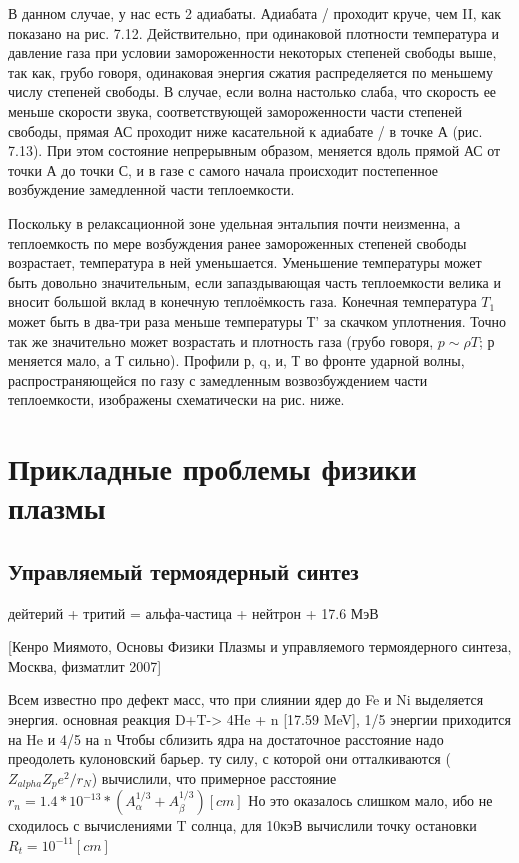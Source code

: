 \documentclass[10pt, a4paper]{article}
\let\stdsection\section
\renewcommand\section{\newpage\stdsection}
\begin{document}
В данном случае, у нас есть 2 адиабаты. Адиабата / проходит круче, чем II, как показано на рис. 7.12. Действительно, при одинаковой плотности температура и давление газа при 
условии замороженности некоторых степеней свободы выше, так как, грубо говоря, одинаковая энергия сжатия распределяется по меньшему числу степеней свободы.
В случае, если волна настолько слаба, что скорость ее меньше скорости звука, соответствующей замороженности части степеней свободы, прямая АС проходит ниже касательной к адиабате / в точке А (рис. 7.13). При этом состояние непрерывным образом, меняется вдоль прямой АС от точки А до точки С, и в газе с самого начала происходит постепенное возбуждение замедленной части теплоемкости. 

Поскольку в релаксационной зоне удельная энтальпия почти неизменна, а теплоемкость по мере возбуждения ранее замороженных степеней свободы возрастает, температура в ней уменьшается. Уменьшение температуры может быть довольно значительным, если запаздывающая часть теплоемкости велика и вносит большой вклад в конечную теплоёмкость газа. Конечная температура $T_1$ может быть в два-три раза меньше температуры Т' за скачком уплотнения. Точно так же значительно может возрастать и плотность газа (грубо говоря, $p \sim \rho T$; р меняется мало, а Т сильно). Профили р, q, и, Т во фронте ударной волны, распространяющейся по газу с замедленным возвозбуждением части теплоемкости, изображены схематически на рис. ниже. 




\section{Прикладные проблемы физики плазмы}


\subsection{Управляемый термоядерный синтез}

дейтерий + тритий = альфа-частица + нейтрон + 17.6 МэВ

[Кенро Миямото, Основы Физики Плазмы и управляемого термоядерного синтеза, Москва, физматлит 2007]

Всем известно про дефект масс, что при слиянии ядер до Fe и Ni выделяется энергия.
основная реакция D+T-> 4He + n [17.59 MeV], 1/5 энергии приходится на He и 4/5 на n
Чтобы сблизить ядра на достаточное расстояние надо преодолеть кулоновский барьер. ту силу, с которой они отталкиваются ($Z_{alpha}Z_p e^2/r_N$) вычислили, что примерное расстояние $r_{n}=1.4*10^{-13}*(A^{1/3}_{\alpha}+A^{1/3}_{\beta}) [cm]$ Но это оказалось слишком мало, ибо не сходилось с вычислениями T солнца, для 10кэВ вычислили точку остановки $R_t=10^{-11} [cm]$
\end{document}
